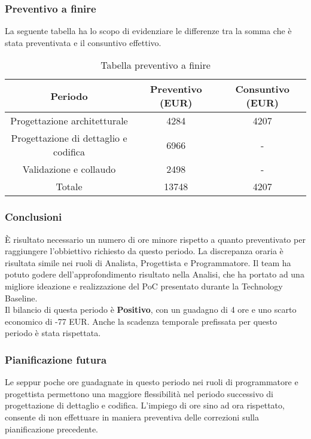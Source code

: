 \subsubsection{Preventivo a finire}
La seguente tabella ha lo scopo di evidenziare le differenze tra la somma che è stata preventivata e il consuntivo effettivo.
\begin{table}[h]
	\caption{Tabella preventivo a finire}  
	\begin{center}
		\begin{tabular}{ |c|c|c|  }
			\hline
			Periodo 								& Preventivo (EUR) & Consuntivo (EUR)\\
			\hline\hline
			Progettazione architetturale			& 4284 				& 4207\\
			Progettazione di dettaglio e codifica	& 6966 			& -\\
			Validazione e collaudo					& 2498 			& -\\
			\hline\hline
			Totale									& 13748 				& 4207 \\
			\hline
		\end{tabular}
	\end{center}
\end{table}
 

\subsubsection{Conclusioni}
È risultato necessario un numero di ore minore rispetto a quanto preventivato per raggiungere l'obbiettivo richiesto da questo periodo. La discrepanza oraria è risultata simile nei ruoli di Analista, Progettista e Programmatore. Il team ha potuto godere dell'approfondimento risultato nella Analisi, che ha portato ad una migliore ideazione e realizzazione del PoC presentato durante la Technology Baseline.
\\Il bilancio di questa periodo è \textbf{Positivo}, con un guadagno di 4 ore e uno scarto economico di -77 EUR. Anche la scadenza temporale prefissata per questo periodo è stata rispettata.

\subsubsection{Pianificazione futura}
Le seppur poche ore guadagnate in questo periodo nei ruoli di programmatore e progettista permettono una maggiore flessibilità nel periodo successivo di progettazione di dettaglio e codifica. L'impiego di ore sino ad ora rispettato, consente di non effettuare in maniera preventiva delle correzioni sulla pianificazione precedente. 